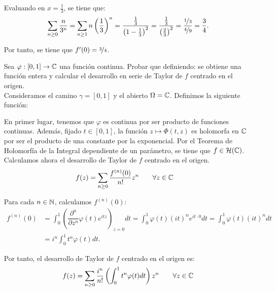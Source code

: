 \begin{ejercicio}
    Evaluando en $x=\frac{1}{3}$, se tiene que:
    \begin{equation*}
        \sum_{n\geq 0}\dfrac{n}{3^n} = \sum_{n\geq 1} n \left(\dfrac{1}{3}\right)^n = \dfrac{\frac{1}{3}}{\left(1-\frac{1}{3}\right)^2} = \dfrac{\frac{1}{3}}{\left(\frac{2}{3}\right)^2} = \dfrac{\nicefrac{1}{3}}{\nicefrac{4}{9}} = \dfrac{3}{4}.
    \end{equation*}

    Por tanto, se tiene que $f'(0) = \nicefrac{3}{4}$.
\end{ejercicio}

\begin{ejercicio}
    Sea $\varphi : [0,1]\to\mathbb{C}$ una función continua. Probar que definiendo:
    se obtiene una función entera y calcular el desarrollo en serie de Taylor de $f$ centrado en el origen.\\

    Consideramos el camino $\gamma=[0,1]$ y el abierto $\Omega=\mathbb{C}$. Definimos la siguiente función:

    En primer lugar, tenemos que $\varphi$ es continua por ser producto de funciones continuas. Además, fijado $t\in[0,1]$, la función $z\mapsto \Phi(t,z)$ es holomorfa en $\mathbb{C}$ por ser el producto de una constante por la exponencial. Por el Teorema de Holomorfía de la Integral dependiente de un parámetro, se tiene que $f\in \mathcal{H}(\mathbb{C})$. Calculamos ahora el desarrollo de Taylor de $f$ centrado en el origen.
    \begin{align*}
        f(z) &= \sum_{n\geq 0} \dfrac{f^{(n)}(0)}{n!} z^n\qquad \forall z\in\mathbb{C}
    \end{align*}

    Para cada $n\in\mathbb{N}$, calculamos $f^{(n)}(0)$:
    \begin{align*}
        f^{(n)}(0) &= \int_0^1 \left(\dfrac{\partial^{n}}{\partial z^n} \varphi(t)e^{itz}\right)_{z=0} dt
        = \int_0^1 \varphi(t) \left(it\right)^n e^{it\cdot 0} dt
        = \int_0^1 \varphi(t) (it)^n dt\\
        &= i^n \int_0^1 t^n \varphi(t) dt.
    \end{align*}

    Por tanto, el desarrollo de Taylor de $f$ centrado en el origen es:
    \begin{align*}
        f(z) &= \sum_{n\geq 0} \dfrac{i^n}{n!} \left(\int_0^1 t^n \varphi(t) dt\right) z^n\qquad \forall z\in\mathbb{C}\\
    \end{align*}
\end{ejercicio}


